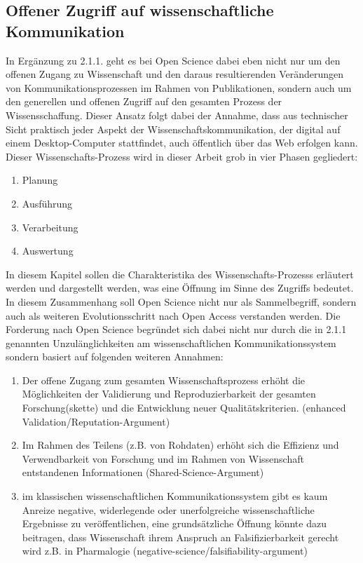\subsection{Offener Zugriff auf wissenschaftliche Kommunikation}
In Ergänzung zu 2.1.1. geht es bei Open Science dabei eben nicht nur um den offenen Zugang zu Wissenschaft und den daraus resultierenden Veränderungen von Kommunikationsprozessen im Rahmen von Publikationen, sondern auch um den generellen und offenen Zugriff auf den gesamten Prozess der Wissensschaffung. Dieser Ansatz folgt dabei der Annahme, dass aus technischer Sicht praktisch jeder Aspekt der Wissenschaftskommunikation, der digital auf einem Desktop-Computer stattfindet, auch öffentlich über das Web erfolgen kann\cite{mietchen2012wissenschaft}. Dieser Wissenschafts-Prozess wird in dieser Arbeit grob in vier Phasen gegliedert:
\begin{enumerate}
\item Planung
\item Ausführung
\item Verarbeitung
\item Auswertung
\end{enumerate}
In diesem Kapitel sollen die Charakteristika des Wissenschafts-Prozesss erläutert werden und dargestellt werden, was eine Öffnung im Sinne des Zugriffs bedeutet. In diesem Zusammenhang soll Open Science nicht nur als Sammelbegriff, sondern auch als weiteren Evolutionsschritt nach Open Access verstanden werden. Die Forderung nach Open Science begründet sich dabei nicht nur durch die in 2.1.1 genannten Unzulänglichkeiten am wissenschaftlichen Kommunikationssystem sondern basiert auf folgenden weiteren Annahmen:
\begin{enumerate}
\item Der offene Zugang zum gesamten Wissenschaftsprozess erhöht die Möglichkeiten der Validierung und Reproduzierbarkeit der gesamten Forschung(skette) und die Entwicklung neuer Qualitätskriterien. (enhanced Validation/Reputation-Argument)
\item Im Rahmen des Teilens (z.B. von Rohdaten) erhöht sich die Effizienz und Verwendbarkeit von Forschung und im Rahmen von Wissenschaft entstandenen Informationen (Shared-Science-Argument)
\item im klassischen wissenschaftlichen Kommunikationssystem gibt es kaum Anreize negative, widerlegende oder unerfolgreiche wissenschaftliche Ergebnisse zu veröffentlichen, eine grundsätzliche Öffnung könnte dazu beitragen, dass Wissenschaft ihrem Anspruch an Falsifizierbarkeit gerecht wird z.B. in Pharmalogie (negative-science/falsifiability-argument)
\end{enumerate}

